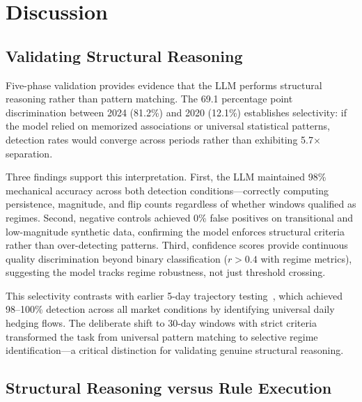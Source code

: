 \section{Discussion}
\label{sec:discussion}

\subsection{Validating Structural Reasoning}

Five-phase validation provides evidence that the LLM performs structural reasoning rather than pattern matching. The 69.1 percentage point discrimination between 2024 (81.2\%) and 2020 (12.1\%) establishes selectivity: if the model relied on memorized associations or universal statistical patterns, detection rates would converge across periods rather than exhibiting 5.7$\times$ separation.

Three findings support this interpretation. First, the LLM maintained 98\% mechanical accuracy across both detection conditions---correctly computing persistence, magnitude, and flip counts regardless of whether windows qualified as regimes. Second, negative controls achieved 0\% false positives on transitional and low-magnitude synthetic data, confirming the model enforces structural criteria rather than over-detecting patterns. Third, confidence scores provide continuous quality discrimination beyond binary classification ($r > 0.4$ with regime metrics), suggesting the model tracks regime robustness, not just threshold crossing.

This selectivity contrasts with earlier 5-day trajectory testing~\cite{regan2025obfuscation}, which achieved 98--100\% detection across all market conditions by identifying universal daily hedging flows. The deliberate shift to 30-day windows with strict criteria transformed the task from universal pattern matching to selective regime identification---a critical distinction for validating genuine structural reasoning.

\subsection{Structural Reasoning versus Rule Execution}

